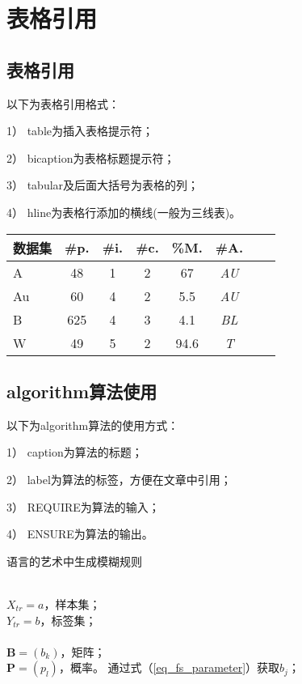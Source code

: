 \documentclass{standalone}
\begin{document}
\chapter{表格引用}
\section{表格引用}
以下为表格引用格式：

1） table为插入表格提示符；

2） bicaption为表格标题提示符；

3） tabular及后面大括号为表格的列；

4） hline为表格行添加的横线(一般为三线表)。


\begin{table}[htbp]
	\renewcommand{\arraystretch}{0.75}
	\label{tab_dataset}
	\setlength{\tabcolsep}{1pt}
	\centering 
	\begin{tabular}{lccccccc}
		\hline
		数据集 & \#p. & \#i. & \#c. & \%M. & \#A.\\
		\hline
		A & 48 & 1 & 2 & 67 & \textsl{AU}\\
		Au & 60 & 4 & 2 & 5.5 & \textsl{AU}\\
		B & 625 & 4 & 3 & 4.1 & \textsl{BL}\\  
		W & 49 & 5 & 2 & 94.6 & \textsl{T}\\
		\hline
	\end{tabular}
\end{table}

\section{algorithm算法使用}
以下为algorithm算法的使用方式：

1） caption为算法的标题；

2） label为算法的标签，方便在文章中引用；

3） REQUIRE为算法的输入；

4） ENSURE为算法的输出。


\begin{algorithm}[htbp]
	\caption{语言的艺术中生成模糊规则}
	\begin{algorithmic}[1]
		\REQUIRE \;\\
		$X_{tr} ={a}$，样本集；\\
		$Y_{tr} ={b}$，标签集；\\
		\ENSURE \;\\
		$\bm{B} = (b_{k})$，矩阵；\\
		$\bm{P} = (p_{l})$，概率。 
		\STATE 通过式（\ref{eq_fs_parameter}）获取$b_{j}$；
		\ENDFOR
		\ENDFOR
	\end{algorithmic}
	\label{alg_iwm_train}
\end{algorithm}
\end{document}
